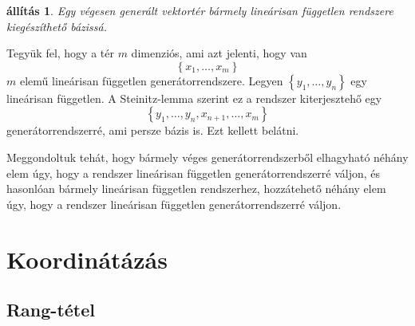 \documentclass[9pt,showtrims]{memoir}
\makeatletter
\renewenvironment{proof}[1][\proofname]
    {\par\pushQED{\qed}%
    \normalfont \topsep6\p@\@plus6\p@\relax
    \trivlist
    \item[\hskip\labelsep
        \itshape
    #1\@addpunct{:}]\ignorespaces}
    {\popQED\endtrivlist\@endpefalse}
\theoremstyle{plain}
\newtheorem{proposition}{állítás}[chapter]
\theoremstyle{remark}
\theoremstyle{definition}
\makeatother
\begin{document}
\begin{proposition}
    Egy végesen generált vektortér bármely lineárisan független rendszere kiegészíthető bázissá.
    \label{pr:lfgtenbazissa}
\end{proposition}
\begin{proof}
    Tegyük fel, hogy a tér $m$ dimenziós, ami azt jelenti, hogy van 
    \[
        \left\{ x_1,\dots,x_m \right\}
    \]
    $m$ elemű lineárisan független generátorrendszere.
    Legyen $\left\{ y_1,\dots,y_n \right\}$ egy lineárisan független.
    A Steinitz-lemma szerint ez a rendszer kiterjesztehő egy 
    \[
        \left\{ y_1,\dots,y_n,x_{n+1},\dots,x_m \right\}
    \]
    generátorrendszerré, ami persze bázis is.
    Ezt kellett belátni. 
\end{proof}

Meggondoltuk tehát, hogy bármely véges generátorrendszerből elhagyható néhány elem úgy, 
hogy a rendszer lineárisan független generátorrendszerré váljon,
és hasonlóan bármely lineárisan független rendszerhez, hozzátehető néhány elem úgy, hogy a
rendszer lineárisan független generátorrendszerré váljon.





\chapter{Koordinátázás}
\section{Rang-tétel}
\end{document}
